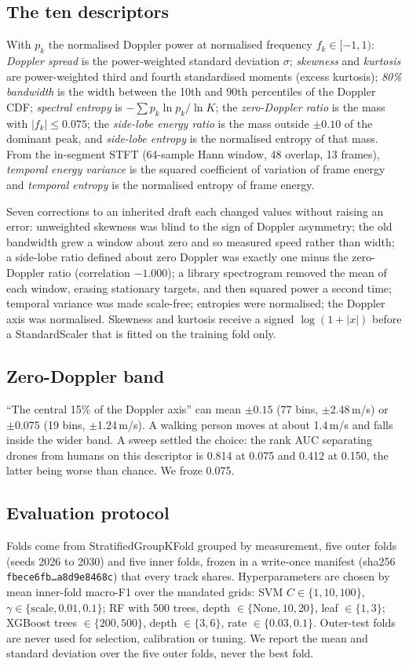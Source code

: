 \documentclass[conference]{IEEEtran}
\begin{document}
\subsection{The ten descriptors}
With $p_k$ the normalised Doppler power at normalised frequency $f_k \in [-1,1)$: \emph{Doppler spread} is the power-weighted standard deviation $\sigma$; \emph{skewness} and \emph{kurtosis} are power-weighted third and fourth standardised moments (excess kurtosis); \emph{80\% bandwidth} is the width between the 10th and 90th percentiles of the Doppler CDF; \emph{spectral entropy} is $-\sum p_k\ln p_k/\ln K$; the \emph{zero-Doppler ratio} is the mass with $|f_k|\le 0.075$; the \emph{side-lobe energy ratio} is the mass outside $\pm0.10$ of the dominant peak, and \emph{side-lobe entropy} is the normalised entropy of that mass. From the in-segment STFT (64-sample Hann window, 48 overlap, 13 frames), \emph{temporal energy variance} is the squared coefficient of variation of frame energy and \emph{temporal entropy} is the normalised entropy of frame energy.

Seven corrections to an inherited draft each changed values without raising an error: unweighted skewness was blind to the sign of Doppler asymmetry; the old bandwidth grew a window about zero and so measured speed rather than width; a side-lobe ratio defined about zero Doppler was exactly one minus the zero-Doppler ratio (correlation $-1.000$); a library spectrogram removed the mean of each window, erasing stationary targets, and then squared power a second time; temporal variance was made scale-free; entropies were normalised; the Doppler axis was normalised. Skewness and kurtosis receive a signed $\log(1+|x|)$ before a StandardScaler that is fitted on the training fold only.

\subsection{Zero-Doppler band}
\label{sec:zd}
``The central 15\% of the Doppler axis'' can mean $\pm0.15$ (77 bins, $\pm$2.48\,m/s) or $\pm0.075$ (19 bins, $\pm$1.24\,m/s). A walking person moves at about 1.4\,m/s and falls inside the wider band. A sweep settled the choice: the rank AUC separating drones from humans on this descriptor is 0.814 at 0.075 and 0.412 at 0.150, the latter being worse than chance. We froze 0.075.

\subsection{Evaluation protocol}
Folds come from StratifiedGroupKFold grouped by measurement, five outer folds (seeds 2026 to 2030) and five inner folds, frozen in a write-once manifest (sha256 \texttt{fbece6fb\ldots a8d9e8468c}) that every track shares. Hyperparameters are chosen by mean inner-fold macro-F1 over the mandated grids: SVM $C\in\{1,10,100\}$, $\gamma\in\{\text{scale},0.01,0.1\}$; RF with 500 trees, depth $\in\{\text{None},10,20\}$, leaf $\in\{1,3\}$; XGBoost trees $\in\{200,500\}$, depth $\in\{3,6\}$, rate $\in\{0.03,0.1\}$. Outer-test folds are never used for selection, calibration or tuning. We report the mean and standard deviation over the five outer folds, never the best fold.
\end{document}
